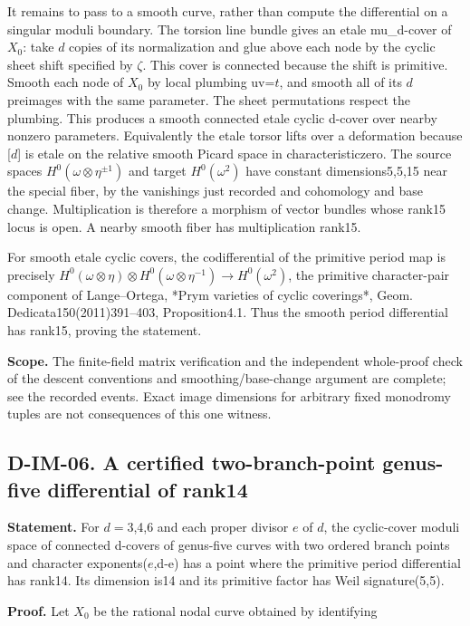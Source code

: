 It remains to pass to a smooth curve, rather than compute the differential on a singular moduli boundary. The torsion line bundle gives an etale mu\_d-cover of \(X_0\): take \(d\) copies of its normalization and glue above each node by the cyclic sheet shift specified by \(\zeta\). This cover is connected because the shift is primitive. Smooth each node of \(X_0\) by local plumbing uv=\(t\), and smooth all of its \(d\) preimages with the same parameter. The sheet permutations respect the plumbing. This produces a smooth connected etale cyclic d-cover over nearby nonzero parameters. Equivalently the etale torsor lifts over a deformation because [\(d\)] is etale on the relative smooth Picard space in characteristiczero. The source spaces \(H^0(\omega\otimes\eta^{\pm1})\) and target \(H^0(\omega^2)\) have constant dimensions5,5,15 near the special fiber, by the vanishings just recorded and cohomology and base change. Multiplication is therefore a morphism of vector bundles whose rank15 locus is open. A nearby smooth fiber has multiplication rank15.

For smooth etale cyclic covers, the codifferential of the primitive period map is precisely \(H^0(\omega\otimes\eta)\otimes H^0(\omega\otimes\eta^{-1})\to H^0(\omega^2)\), the primitive character-pair component of Lange--Ortega, *Prym varieties of cyclic coverings*, Geom. Dedicata150(2011)391--403, Proposition4.1. Thus the smooth period differential has rank15, proving the statement. \cite{IM-LangeOrtega}

\textbf{Scope.} The finite-field matrix verification and the independent whole-proof check of the descent conventions and smoothing/base-change argument are complete; see the recorded events. Exact image dimensions for arbitrary fixed monodromy tuples are not consequences of this one witness.

\subsection{D-IM-06. A certified two-branch-point genus-five differential of rank14}
\label{D-IM-06}

\textbf{Statement.} For \(d= 3\),4,6 and each proper divisor \(e\) of \(d\), the cyclic-cover moduli space of connected d-covers of genus-five curves with two ordered branch points and character exponents(\(e\),d-e) has a point where the primitive period differential has rank14. Its dimension is14 and its primitive factor has Weil signature(5,5).

\textbf{Proof.} Let \(X_0\) be the rational nodal curve obtained by identifying

